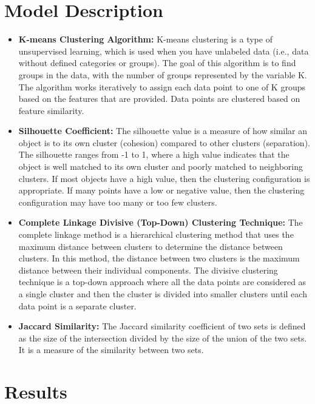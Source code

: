 \documentclass[12pt]{article}
\begin{document}
	\section{Model Description}
	\begin{itemize}
		\item \textbf{K-means Clustering Algorithm:} K-means clustering is a type of unsupervised learning, which is used when you have unlabeled data (i.e., data without defined categories or groups). The goal of this algorithm is to find groups in the data, with the number of groups represented by the variable K. The algorithm works iteratively to assign each data point to one of K groups based on the features that are provided. Data points are clustered based on feature similarity.
		\item \textbf{Silhouette Coefficient:} The silhouette value is a measure of how similar an object is to its own cluster (cohesion) compared to other clusters (separation). The silhouette ranges from -1 to 1, where a high value indicates that the object is well matched to its own cluster and poorly matched to neighboring clusters. If most objects have a high value, then the clustering configuration is appropriate. If many points have a low or negative value, then the clustering configuration may have too many or too few clusters.
		\item \textbf{Complete Linkage Divisive (Top-Down) Clustering Technique:} The complete linkage method is a hierarchical clustering method that uses the maximum distance between clusters to determine the distance between clusters. In this method, the distance between two clusters is the maximum distance between their individual components. The divisive clustering technique is a top-down approach where all the data points are considered as a single cluster and then the cluster is divided into smaller clusters until each data point is a separate cluster.
		\item \textbf{Jaccard Similarity:} The Jaccard similarity coefficient of two sets is defined as the size of the intersection divided by the size of the union of the two sets. It is a measure of the similarity between two sets.
	\end{itemize}
	\section{Results}
\end{document}
